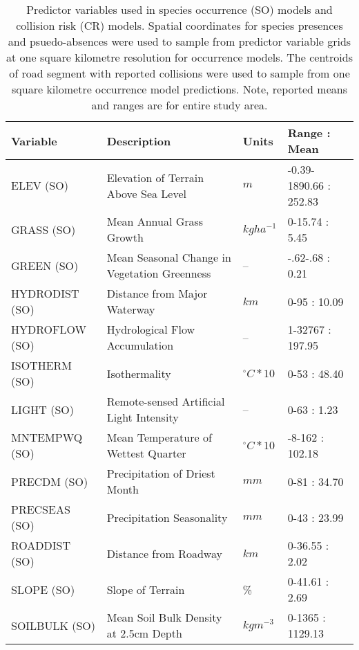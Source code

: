 \begin{table}[htp]
\caption{Predictor variables used in species occurrence (SO) models and collision risk (CR) models. Spatial coordinates for species presences and psuedo-absences were used to sample from predictor variable grids at one square kilometre resolution for occurrence models. The centroids of road segment with reported collisions were used to sample from one square kilometre occurrence model predictions. Note, reported means and ranges are for entire study area.}
\begin{tabularx}{\textwidth}{lYll} \toprule
Variable       &Description                                               &Units          &Range : Mean\\
\midrule 
ELEV (SO)       &Elevation of Terrain Above Sea Level                     &$m$			  &-0.39-1890.66 : 252.83\\
GRASS (SO)      &Mean Annual Grass Growth					              &$kg ha^{-1}$   &0-15.74 : 5.45\\
GREEN (SO)      &Mean Seasonal Change in Vegetation Greenness             &--             &-.62-.68 : 0.21\\
HYDRODIST (SO)  &Distance from Major Waterway                             &$km$           &0-95 : 10.09\\
HYDROFLOW (SO)  &Hydrological Flow Accumulation                           &--             &1-32767 : 197.95\\
ISOTHERM (SO)   &Isothermality                                            &$^{\circ}C*10$ &0-53 : 48.40\\
LIGHT (SO)      &Remote-sensed Artificial Light Intensity                 &--             &0-63 : 1.23\\
MNTEMPWQ (SO)   &Mean Temperature of Wettest Quarter                      &$^{\circ}C*10$ &-8-162 : 102.18\\
PRECDM (SO)     &Precipitation of Driest Month                            &$mm$           &0-81 : 34.70\\
PRECSEAS (SO)   &Precipitation Seasonality                                &$mm$           &0-43 : 23.99\\
ROADDIST (SO)   &Distance from Roadway                                    &$km$           &0-36.55 : 2.02\\
SLOPE (SO)      &Slope of Terrain                                         &\%             &0-41.61 : 2.69\\
SOILBULK (SO)   &Mean Soil Bulk Density at 2.5cm Depth                    &$kg m^{-3}$       &0-1365 : 1129.13\\

\end{tabularx}
\end{table}
